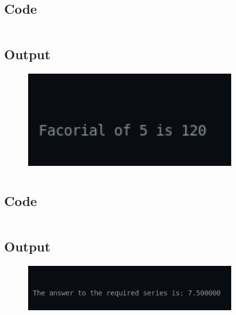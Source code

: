 \documentclass[12pt]{article}
\begin{document}
\newpage
\section{}
\subsection{Code}
\inputminted{c}{q11.c}
\subsection{Output}
\begin{figure}[h]
    \centering
    \includegraphics[width=0.8\textwidth]{11.png}
\end{figure}

\newpage
\section{}
\subsection{Code}
\inputminted{c}{q12.c}
\subsection{Output}
\begin{figure}[h]
    \centering
    \includegraphics[width=0.8\textwidth]{12.png}
\end{figure}
\end{document}
